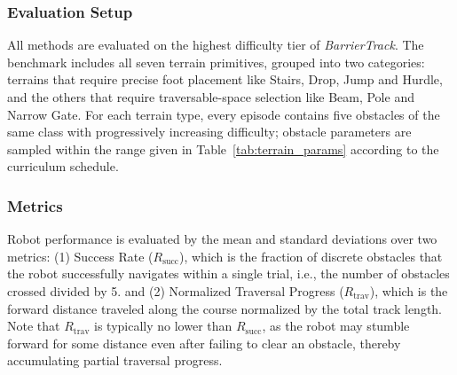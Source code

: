 \subsubsection{Evaluation Setup}
All methods are evaluated on the highest difficulty tier of \textit{BarrierTrack}. The benchmark includes all seven terrain primitives, grouped into two categories: terrains that require precise foot placement like Stairs, Drop, Jump and Hurdle, and the others that require traversable-space selection like Beam, Pole and Narrow Gate. For each terrain type, every episode contains five obstacles of the same class with progressively increasing difficulty; obstacle parameters are sampled within the range given in Table~\ref{tab:terrain_params} according to the curriculum schedule.

\subsubsection{Metrics}
Robot performance is evaluated by the mean and standard deviations over two metrics:
(1) Success Rate ($R_{\mathrm{succ}}$), which is the fraction of discrete obstacles that the robot successfully navigates within a single trial, i.e., the number of obstacles crossed divided by 5. 
and (2) Normalized Traversal Progress ($R_{\mathrm{trav}}$), which is the forward distance traveled along the course normalized by the total track length. Note that $R_{\mathrm{trav}}$ is typically no lower than $R_{\mathrm{succ}}$, as the robot may stumble forward for some distance even after failing to clear an obstacle, thereby accumulating partial traversal progress.

